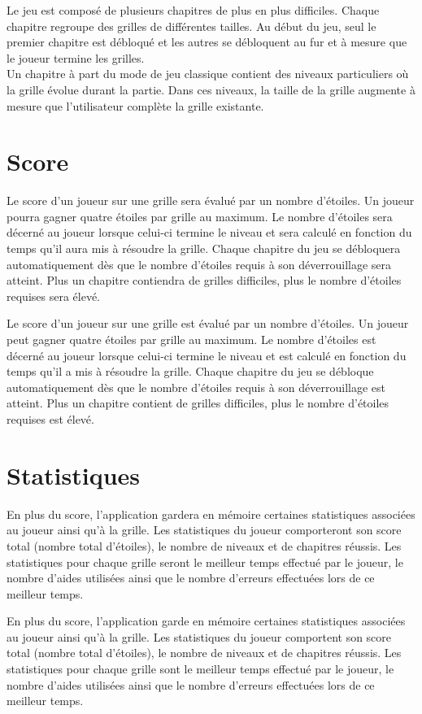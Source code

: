 \documentclass{report}
\begin{document}
			Le jeu est composé de plusieurs chapitres de plus en plus difficiles. Chaque chapitre regroupe des grilles de différentes tailles. Au début du jeu, seul le premier chapitre est débloqué et les autres se débloquent au fur et à mesure que le joueur termine les grilles.\\
			Un chapitre à part du mode de jeu classique contient des niveaux particuliers où la grille évolue durant la partie. Dans ces niveaux, la taille de la grille augmente à mesure que l'utilisateur complète la grille existante.

		\section{Score}
			Le score d'un joueur sur une grille sera évalué par un nombre d'étoiles. Un joueur pourra gagner quatre étoiles par grille au maximum. Le nombre d'étoiles sera décerné au joueur lorsque celui-ci termine le niveau et sera calculé en fonction du temps qu'il aura mis à résoudre la grille. Chaque chapitre du jeu se débloquera automatiquement dès que le nombre d'étoiles requis à son déverrouillage sera atteint. Plus un chapitre contiendra de grilles difficiles, plus le nombre d'étoiles requises sera élevé.

			Le score d'un joueur sur une grille est évalué par un nombre d'étoiles. Un joueur peut gagner quatre étoiles par grille au maximum. Le nombre d'étoiles est décerné au joueur lorsque celui-ci termine le niveau et est calculé en fonction du temps qu'il a mis à résoudre la grille. Chaque chapitre du jeu se débloque automatiquement dès que le nombre d'étoiles requis à son déverrouillage est atteint. Plus un chapitre contient de grilles difficiles, plus le nombre d'étoiles requises est élevé.
				
		\section{Statistiques}
			En plus du score, l'application gardera en mémoire certaines statistiques associées au joueur ainsi qu'à la grille. Les statistiques du joueur comporteront son score total (nombre total d'étoiles), le nombre de niveaux et de chapitres réussis. Les statistiques pour chaque grille seront le meilleur temps effectué par le joueur, le nombre d'aides utilisées ainsi que le nombre d'erreurs effectuées lors de ce meilleur temps.

			En plus du score, l'application garde en mémoire certaines statistiques associées au joueur ainsi qu'à la grille. Les statistiques du joueur comportent son score total (nombre total d'étoiles), le nombre de niveaux et de chapitres réussis. Les statistiques pour chaque grille sont le meilleur temps effectué par le joueur, le nombre d'aides utilisées ainsi que le nombre d'erreurs effectuées lors de ce meilleur temps.
			
\end{document}
